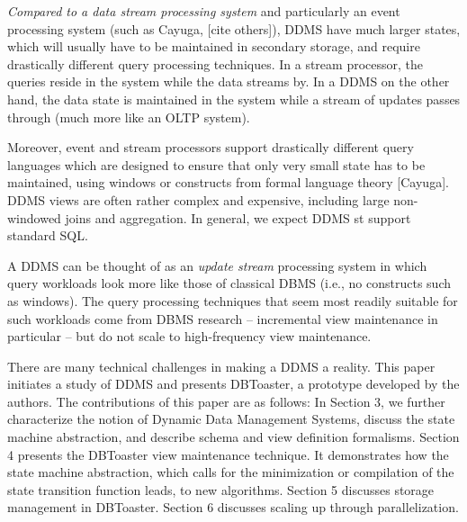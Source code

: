 {\em Compared to a data stream processing system}\/
and particularly an event processing system (such as Cayuga, [cite others]),
%
DDMS have much larger states, which will usually have to be maintained in
secondary storage, and require drastically different query processing
techniques. In a stream processor, the queries reside in the system while the
data streams by. In a DDMS on the other hand, the data state is maintained in
the system while a stream of updates passes through (much more like an OLTP
system).

%
Moreover, event and stream processors support drastically different query
languages which are designed to ensure that only very small state has to be
maintained, using windows or constructs from formal language theory [Cayuga]. 
DDMS views are often rather complex and expensive, including large
non-windowed joins and aggregation. In general, we expect DDMS st support
standard SQL.


A DDMS can be thought of as an {\em update stream}\/ processing system in which
query workloads look more like those of classical DBMS (i.e., no constructs such
as windows). The query processing techniques that seem most readily suitable for
such workloads come from DBMS research -- incremental view maintenance in
particular -- but do not scale to high-frequency view maintenance.




There are many technical challenges in making a DDMS a reality. This paper
initiates a study of DDMS and presents DBToaster, a prototype developed by
the authors. The contributions of this paper are as follows:
In Section 3, we further characterize the notion of Dynamic Data
Management Systems, discuss the state machine abstraction, and describe
schema and view definition formalisms.
Section 4 presents the DBToaster view maintenance technique. It demonstrates how
the state machine abstraction, which calls for the minimization or compilation
of the state transition function leads, to new algorithms.
Section 5 discusses storage management in DBToaster.
Section 6 discusses scaling up through parallelization.

